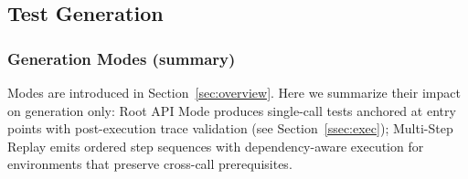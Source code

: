 \documentclass[conference]{IEEEtran}
\begin{document}
\subsection{Test Generation}
\label{ssec:gen}

\subsubsection*{Generation Modes (summary)}\label{ssec:gen-modes}
Modes are introduced in Section~\ref{sec:overview}. Here we summarize their impact on generation only: Root API Mode produces single-call tests anchored at entry points with post-execution trace validation (see Section~\ref{ssec:exec}); Multi-Step Replay emits ordered step sequences with dependency-aware execution for environments that preserve cross-call prerequisites.
\end{document}
